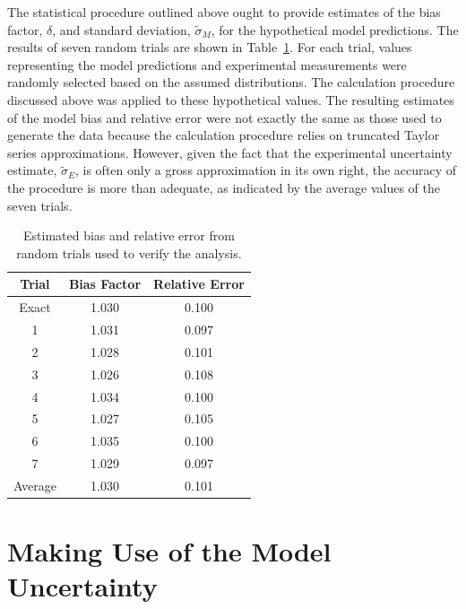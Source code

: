 The statistical procedure outlined above ought to provide estimates of the bias factor, $\delta$, and standard deviation, $\widetilde{\sigma}_M$, for the
hypothetical model predictions. The results of seven random trials are shown in Table~\ref{trials}. For each trial, values representing the model
predictions and experimental measurements were randomly selected based on the assumed distributions. The calculation procedure discussed above was applied to these
hypothetical values. The resulting estimates of the model bias and relative error were not exactly the same as those used to generate the data
because the calculation procedure relies on truncated Taylor series approximations.
However, given the fact that the experimental uncertainty estimate,
$\widetilde{\sigma}_E$, is often only a gross approximation in its own right, the accuracy of the procedure is more than adequate, as indicated by the average values
of the seven trials.

\begin{table}[t]
\caption{Estimated bias and relative error from random trials used to verify the analysis. }
\begin{center}
\begin{tabular}{|c|c|c|}
\hline
Trial   & Bias Factor      & Relative Error \\ \hline \hline
Exact   & 1.030            &    0.100            \\ \hline \hline
1       & 1.031            &    0.097            \\ \hline
2       & 1.028            &    0.101            \\ \hline
3       & 1.026            &    0.108            \\ \hline
4       & 1.034            &    0.100            \\ \hline
5       & 1.027            &    0.105            \\ \hline
6       & 1.035            &    0.100            \\ \hline
7       & 1.029            &    0.097            \\ \hline \hline
Average & 1.030            &    0.101            \\ \hline
\end{tabular}
\end{center}
\label{trials}
\end{table}





\section{Making Use of the Model Uncertainty}


